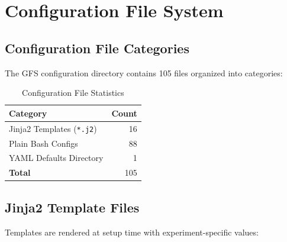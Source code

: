 \documentclass[11pt,letterpaper]{article}
\begin{document}
\section{Configuration File System}

\subsection{Configuration File Categories}

The GFS configuration directory contains 105 files organized into categories:

\begin{table}[H]
\centering
\caption{Configuration File Statistics}
\label{tab:config-stats}
\begin{tabular}{@{}lr@{}}
\toprule
\textbf{Category} & \textbf{Count} \\
\midrule
Jinja2 Templates (\texttt{*.j2}) & 16 \\
Plain Bash Configs & 88 \\
YAML Defaults Directory & 1 \\
\midrule
\textbf{Total} & 105 \\
\bottomrule
\end{tabular}
\end{table}

\subsection{Jinja2 Template Files}

Templates are rendered at setup time with experiment-specific values:
\end{document}

